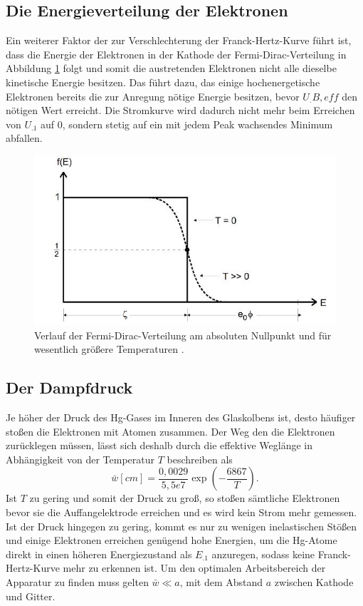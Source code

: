 \subsection{Die Energieverteilung der Elektronen}
Ein weiterer Faktor der zur Verschlechterung der Franck-Hertz-Kurve führt ist, dass die Energie der Elektronen in der Kathode der Fermi-Dirac-Verteilung in Abbildung \ref{fig:fermi} folgt und somit die austretenden Elektronen nicht alle dieselbe kinetische Energie besitzen. Das führt dazu, das einige hochenergetische Elektronen bereits die zur Anregung nötige Energie besitzen, bevor $U_.{B,eff}$ den nötigen Wert erreicht. Die Stromkurve wird dadurch nicht mehr beim Erreichen von $U_.1$ auf 0, sondern stetig auf ein mit jedem Peak wachsendes Minimum abfallen.
\begin{figure}
\centering
\includegraphics[width=\linewidth-70pt,height=\textheight-70pt,keepaspectratio]{content/images/fermi.jpg}
\caption{Verlauf der Fermi-Dirac-Verteilung am absoluten Nullpunkt und für wesentlich größere Temperaturen \cite{V504}.\label{fig:fermi}}
\end{figure}
\subsection{Der Dampfdruck}
Je höher der Druck des Hg-Gases im Inneren des Glaskolbens ist, desto häufiger stoßen die Elektronen mit Atomen zusammen. Der Weg den die Elektronen zurücklegen müssen, lässt sich deshalb durch die effektive Weglänge in Abhängigkeit von der Temperatur $T$ beschreiben als
\begin{equation}
\bar{w}[cm]=\frac{0,0029}{5,5e7}\exp{\left(-\frac{6867}{T}\right)}\text{.}\label{eq:w}
\end{equation}
Ist $T$ zu gering und somit der Druck zu groß, so stoßen sämtliche Elektronen bevor sie die Auffangelektrode erreichen und es wird kein Strom mehr gemessen. Ist der Druck hingegen zu gering, kommt es nur zu wenigen inelastischen Stößen und einige Elektronen erreichen genügend hohe Energien, um die Hg-Atome direkt in einen höheren Energiezustand als $E_.1$ anzuregen, sodass keine Franck-Hertz-Kurve mehr zu erkennen ist.
Um den optimalen Arbeitsbereich der Apparatur zu finden muss gelten $\bar{w}\ll a$, mit dem Abstand $a$ zwischen Kathode und Gitter.